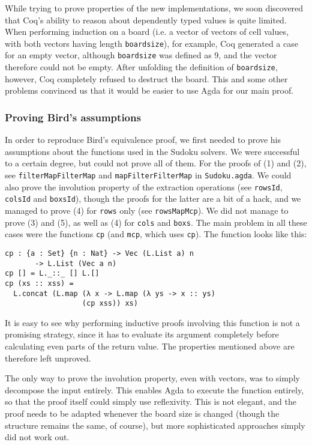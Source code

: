 \documentclass[a4paper,11pt]{article}
\begin{document}
While trying to prove properties of the new implementations, we soon discovered that Coq's ability to reason about dependently typed values is quite limited. When performing induction on a board (i.e. a vector of vectors of cell values, with both vectors having length \texttt{boardsize}), for example, Coq generated a case for an empty vector, although \texttt{boardsize} was defined as 9, and the vector therefore could not be empty. After unfolding the definition of \texttt{boardsize}, however, Coq completely refused to destruct the board. This and some other problems convinced us that it would be easier to use Agda for our main proof.

\subsubsection{Proving Bird's assumptions}
In order to reproduce Bird's equivalence proof, we first needed to prove his assumptions about the functions used in the Sudoku solvers. We were successful to a certain degree, but could not prove all of them. For the proofs of (1) and (2), see \texttt{filterMapFilterMap} and \texttt{mapFilterFilterMap} in \texttt{Sudoku.agda}. We could also prove the involution property of the extraction operations (see \texttt{rowsId}, \texttt{colsId} and \texttt{boxsId}), though the proofs for the latter are a bit of a hack, and we managed to prove (4) for \texttt{rows} only (see \texttt{rowsMapMcp}). We did not manage to prove (3) and (5), as well as (4) for \texttt{cols} and \texttt{boxs}. The main problem in all these cases were the functions \texttt{cp} (and \texttt{mcp}, which uses \texttt{cp}). The function looks like this:
\begin{lstlisting}
cp : {a : Set} {n : Nat} -> Vec (L.List a) n 
       -> L.List (Vec a n)
cp [] = L._::_ [] L.[]
cp (xs :: xss) = 
  L.concat (L.map (λ x -> L.map (λ ys -> x :: ys) 
                  (cp xss)) xs)
\end{lstlisting}

It is easy to see why performing inductive proofs involving this function is not a promising strategy, since it has to evaluate its argument completely before calculating even parts of the return value. The properties mentioned above are therefore left unproved.

The only way to prove the involution property, even with vectors, was to simply decompose the input entirely. This enables Agda to execute the function entirely, so that the proof itself could simply use reflexivity. This is not elegant, and the proof needs to be adapted whenever the board size is changed (though the structure remains the same, of course), but more sophisticated approaches simply did not work out.
\end{document}
